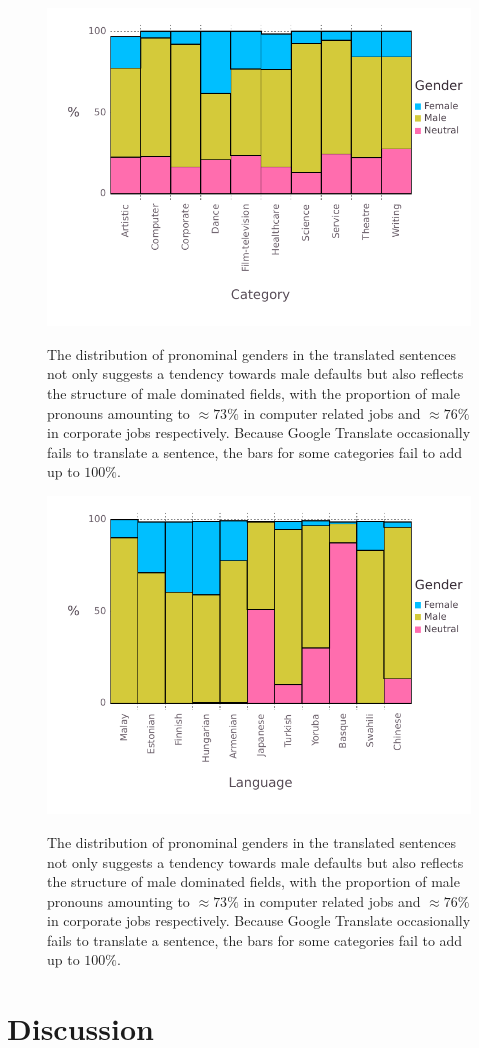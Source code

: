 \documentclass{article}
\begin{document}
\begin{figure}[H]
	\centering
	\includegraphics[width=\linewidth]{pictures/gender-by-category}
	\label{fig:gender-by-category}
	\caption{The distribution of pronominal genders in the translated sentences not only suggests a tendency towards male defaults but also reflects the structure of male dominated fields, with the proportion of male pronouns amounting to $\approx 73\%$ in computer related jobs and $\approx 76\%$ in corporate jobs respectively. Because Google Translate occasionally fails to translate a sentence, the bars for some categories fail to add up to $100\%$.}
\end{figure}

\begin{figure}[H]
	\centering
	\includegraphics[width=\linewidth]{pictures/gender-by-language}
	\label{fig:gender-by-language}
	\caption{The distribution of pronominal genders in the translated sentences not only suggests a tendency towards male defaults but also reflects the structure of male dominated fields, with the proportion of male pronouns amounting to $\approx 73\%$ in computer related jobs and $\approx 76\%$ in corporate jobs respectively. Because Google Translate occasionally fails to translate a sentence, the bars for some categories fail to add up to $100\%$.}
\end{figure}

\section{Discussion}



\end{document}
